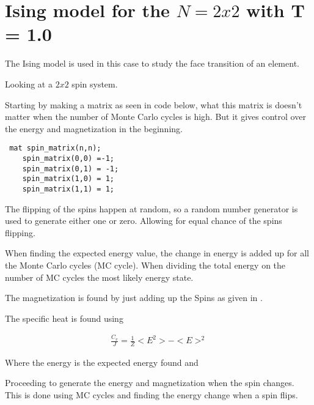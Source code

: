 \section{Ising model for the $N = 2x2$  with T = 1.0}

The Ising model is used in this case to study the face transition of an element. 

Looking at a $2x2$ spin system.

Starting by making a matrix as seen in code below, what this matrix is doesn't matter when the number of Monte Carlo cycles is high. But it gives control over the energy and magnetization in the beginning. 

\begin{lstlisting}
 mat spin_matrix(n,n);
    spin_matrix(0,0) =-1;
    spin_matrix(0,1) = -1;
    spin_matrix(1,0) = 1;
    spin_matrix(1,1) = 1;

\end{lstlisting}

The flipping of the spins happen at random, so a random number generator is used to generate either one or zero. Allowing for equal chance of the spins flipping. 

When finding the expected energy value, the change in energy is added up for all the Monte Carlo cycles (MC cycle). When dividing the total energy on the number of MC cycles the most likely energy state.

The magnetization is found by just adding up the Spins as given in . 

The specific heat is found using 

\begin{align}
\frac{C_v}{J} = \frac{1}{Z} <E^2> - <E>^2
\end{align}

Where the energy is the expected energy found and  


Proceeding to generate the energy and magnetization when the spin changes. This is done using MC cycles and finding the energy change when a spin flips. 

